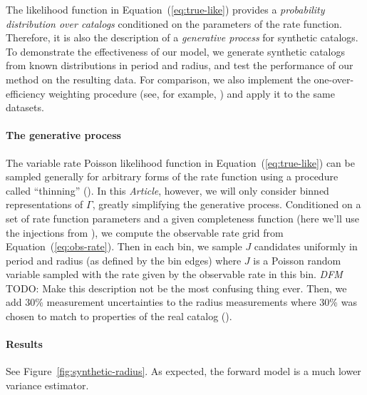 \documentclass[12pt,preprint]{aastex}
\newcommand{\paper}{\emph{Article}}
\newcommand{\Fig}[1]{Figure~\ref{fig:#1}}
\newcommand{\fig}[1]{\Fig{#1}}
\newcommand{\Eq}[1]{Equation~(\ref{eq:#1})}
\newcommand{\eq}[1]{\Eq{#1}}
\newcommand{\todo}[3]{{\color{#2} \emph{#1} TODO: #3}}
\newcommand{\dfmtodo}[1]{\todo{DFM}{red}{#1}}
\newcommand{\rate}{\ensuremath{\Gamma}}
\begin{document}
The likelihood function in \eq{true-like} provides a \emph{probability
distribution over catalogs} conditioned on the parameters of the rate
function.
Therefore, it is also the description of a \emph{generative process} for
synthetic catalogs.
To demonstrate the effectiveness of our model, we generate synthetic catalogs
from known distributions in period and radius, and test the performance of our
method on the resulting data.
For comparison, we also implement the one-over-efficiency weighting procedure
(see, for example, \citealt{howard, dressing, petigura}) and apply it to the
same datasets.

\paragraph{The generative process}
The variable rate Poisson likelihood function in \eq{true-like} can be sampled
generally for arbitrary forms of the rate function using a procedure called
``thinning'' (\citealt{poisson}).
In this \paper, however, we will only consider binned representations of
\rate, greatly simplifying the generative process.
Conditioned on a set of rate function parameters and a given completeness
function (here we'll use the injections from \citealt{petigura}), we compute
the observable rate grid from \eq{obs-rate}.
Then in each bin, we sample $J$ candidates uniformly in period and
radius (as defined by the bin edges) where $J$ is a Poisson random variable
sampled with the rate given by the observable rate in this bin.
\dfmtodo{Make this description not be the most confusing thing ever.}
Then, we add 30\% measurement uncertainties to the radius measurements where
30\% was chosen to match to properties of the real catalog
(\citealt{petigura}).

\paragraph{Results}
See \fig{synthetic-radius}.
As expected, the forward model is a much lower variance estimator.
\end{document}
